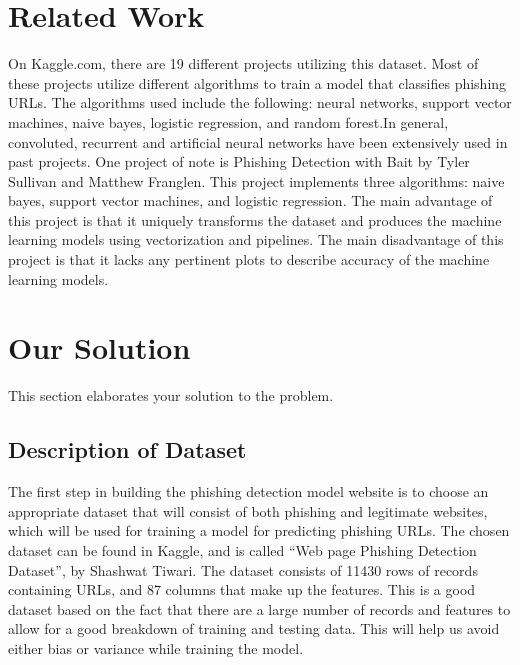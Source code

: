 \documentclass[conference]{IEEEtran}
\begin{document}
\section{Related Work}
On Kaggle.com, there are 19 different projects utilizing this dataset. Most of these projects utilize different algorithms to train a model that classifies phishing URLs. The algorithms  used include the following: neural networks, support vector machines, naive bayes, logistic regression, and random forest.In general, convoluted, recurrent and artificial neural networks have been extensively used in past projects. One project of note is Phishing Detection with Bait by Tyler Sullivan and Matthew Franglen. This project implements three algorithms: naive bayes, support vector machines, and logistic regression. The main advantage of this project is that it uniquely transforms the dataset and produces the machine learning models using vectorization and pipelines. The main disadvantage of this project is that it lacks any pertinent plots to describe accuracy of  the machine learning models.   

\section{Our Solution}
This section elaborates your solution to the problem.

\subsection{Description of Dataset}
The first step in building the phishing detection model website is to choose an appropriate dataset that will consist of both phishing and legitimate websites, which will be used for training a model for predicting phishing URLs. The chosen dataset can be found in Kaggle, and is called  “Web page Phishing Detection Dataset”, by Shashwat Tiwari. The dataset consists of 11430 rows of records containing URLs, and 87 columns that make up the features. This is a good dataset based on the fact that there are a large number of records and features to allow for a good breakdown of training and testing data. This will help us avoid either bias or variance while training the model. 
\end{document}

